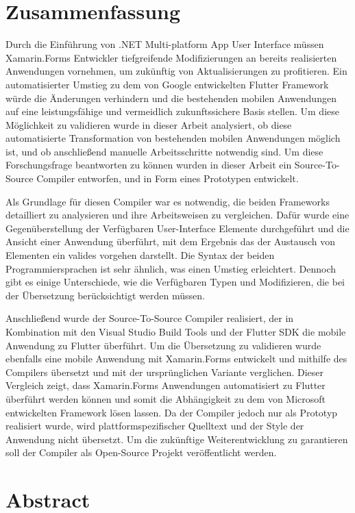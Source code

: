 
\chapter*{Zusammenfassung}
Durch die Einführung von .NET Multi-platform App User Interface müssen Xamarin.Forms Entwickler tiefgreifende Modifizierungen an bereits realisierten Anwendungen vornehmen, um zukünftig von Aktualisierungen zu profitieren.  Ein automatisierter Umstieg zu dem von Google entwickelten Flutter Framework würde die Änderungen verhindern und die bestehenden mobilen Anwendungen auf eine leistungsfähige und vermeidlich zukunftssichere Basis stellen.  Um diese Möglichkeit zu validieren wurde in dieser Arbeit analysiert,  ob diese automatisierte Transformation von bestehenden mobilen Anwendungen möglich ist,  und ob anschließend manuelle Arbeitsschritte notwendig sind.  Um diese Forschungsfrage beantworten zu können wurden in dieser Arbeit ein Source-To-Source Compiler entworfen,  und in Form eines Prototypen entwickelt.  

Als Grundlage für diesen Compiler war es notwendig,  die beiden Frameworks detailliert zu analysieren und ihre Arbeitsweisen zu vergleichen.  Dafür wurde eine Gegenüberstellung der Verfügbaren User-Interface Elemente durchgeführt und die Ansicht einer Anwendung überführt,  mit dem Ergebnis das der Austausch von Elementen ein valides vorgehen darstellt.  Die Syntax der beiden Programmiersprachen ist sehr ähnlich, was einen Umstieg erleichtert. Dennoch gibt es einige Unterschiede,  wie die Verfügbaren Typen und Modifizieren, die bei der Übersetzung berücksichtigt werden müssen.  

Anschließend wurde der Source-To-Source Compiler realisiert,  der in Kombination mit den Visual Studio Build Tools und der Flutter SDK die mobile Anwendung zu Flutter überführt. Um die Übersetzung zu validieren wurde ebenfalls eine mobile Anwendung mit Xamarin.Forms entwickelt und mithilfe des Compilers übersetzt und mit der ursprünglichen Variante verglichen.  
Dieser Vergleich zeigt,  dass Xamarin.Forms Anwendungen automatisiert zu Flutter überführt werden können und somit die Abhängigkeit zu dem von Microsoft entwickelten Framework lösen lassen.  Da der Compiler jedoch nur als Prototyp realisiert wurde,  wird plattformspezifischer Quelltext und der Style der Anwendung nicht übersetzt.  Um die zukünftige Weiterentwicklung zu garantieren soll der Compiler als Open-Source Projekt veröffentlicht werden. 
\chapter*{Abstract}

